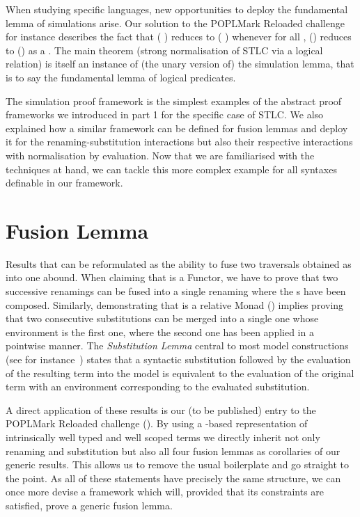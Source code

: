 When studying specific languages, new opportunities to deploy the
fundamental lemma of simulations arise. Our solution to the POPLMark
Reloaded challenge for instance describes the fact that ({  })
reduces to ({  }) whenever for all ,
() reduces to () as a .
The main theorem (strong normalisation of STLC via a logical relation)
is itself an instance of (the unary version of) the simulation lemma,
that is to say the fundamental lemma of logical predicates.

The simulation proof framework is the simplest examples of the abstract
proof frameworks we introduced in part 1 for the specific case of STLC.
We also explained how a similar framework can be defined
for fusion lemmas and deploy it for the renaming-substitution interactions
but also their respective interactions with normalisation by evaluation.
Now that we are familiarised with the techniques at hand, we can tackle
this more complex example for all syntaxes definable in our framework.

\section{Fusion Lemma}\label{section:fusion}

Results that can be reformulated as the ability to fuse two traversals
obtained as  into one abound. When claiming that  is
a Functor, we have to prove that two successive renamings can be fused into
a single renaming where the s have been composed. Similarly,
demonstrating that  is a relative Monad (\cite{JFR4389}) implies proving
that two consecutive substitutions can be merged into a single one whose
environment is the first one, where the second one has been applied in a
pointwise manner. The \emph{Substitution Lemma} central
to most model constructions (see for instance~\cite{mitchell1991kripke}) states
that a syntactic substitution followed by the evaluation of the resulting term
into the model is equivalent to the evaluation of the original term with an
environment corresponding to the evaluated substitution.

A direct application of these results is our (to be published) entry to the
POPLMark Reloaded challenge (\citeyear{poplmarkreloaded}). By using a -based
representation of intrinsically well typed and well scoped terms we directly inherit
not only renaming and substitution but also all four fusion lemmas as corollaries
of our generic results. This allows us to remove the usual boilerplate
and go straight to the point.
As all of these statements have precisely the same structure, we can
once more devise a framework which will, provided that its constraints are
satisfied, prove a generic fusion lemma.

